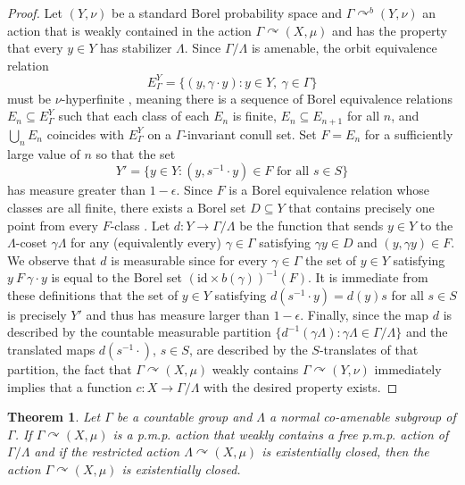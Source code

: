 \documentclass[12pt]{amsart}
\newtheorem{thm}{Theorem}[section]
\theoremstyle{definition}
\newcommand{\pmp}{p{$.$}m{$.$}p{$.$}}
\newcommand{\acts}{\curvearrowright}
\begin{document}
\begin{proof}
	Let $(Y, \nu)$ be a standard Borel probability space and $\Gamma \acts^b (Y, \nu)$ an action that is weakly contained in the action $\Gamma \acts (X, \mu)$ and has the property that every $y \in Y$ has stabilizer $\Lambda$. Since $\Gamma / \Lambda$ is amenable, the orbit equivalence relation
	$$E_\Gamma^Y = \{(y, \gamma \cdot y) : y \in Y, \ \gamma \in \Gamma\}$$
	must be $\nu$-hyperfinite \cite{OW80}, meaning there is a sequence of Borel equivalence relations $E_n \subseteq E_\Gamma^Y$ such that each class of each $E_n$ is finite, $E_n \subseteq E_{n+1}$ for all $n$, and $\bigcup_n E_n$ coincides with $E_\Gamma^Y$ on a $\Gamma$-invariant conull set. Set $F = E_n$ for a sufficiently large value of $n$ so that the set
	$$Y' = \{y \in Y : (y, s^{-1} \cdot y) \in F \text{ for all }s\in S\}$$
	has measure greater than $1-\epsilon$. Since $F$ is a Borel equivalence relation whose classes are all finite, there exists a Borel set $D \subseteq Y$ that contains precisely one point from every $F$-class \cite[Thm 12.16]{K95}. Let $d : Y \rightarrow \Gamma / \Lambda$ be the function that sends $y \in Y$ to the $\Lambda$-coset $\gamma \Lambda$ for any (equivalently every) $\gamma \in \Gamma$ satisfying $\gamma y \in D$ and $(y, \gamma y) \in F$. We observe that $d$ is measurable since for every $\gamma \in \Gamma$ the set of $y \in Y$ satisfying $y \ F \ \gamma \cdot y$ is equal to the Borel set $(\mathrm{id} \times b(\gamma))^{-1}(F)$. It is immediate from these definitions that the set of $y \in Y$ satisfying $d(s^{-1} \cdot y) = d(y) s$ for all $s\in S$ is precisely $Y'$ and thus has measure larger than $1-\epsilon$. Finally, since the map $d$ is described by the countable measurable partition $\{d^{-1}(\gamma \Lambda) : \gamma \Lambda \in \Gamma / \Lambda\}$ and the translated maps $d(s^{-1} \cdot)$, $s \in S$, are described by the $S$-translates of that partition, the fact that $\Gamma \acts (X, \mu)$ weakly contains $\Gamma \acts (Y, \nu)$ immediately implies that a function $c : X \rightarrow \Gamma / \Lambda$ with the desired property exists.
\end{proof}

\begin{thm} \label{thm:lift}
Let $\Gamma$ be a countable group and $\Lambda$ a normal co-amenable subgroup of $\Gamma$. If $\Gamma \acts (X, \mu)$ is a {\pmp} action that weakly contains a free {\pmp} action of $\Gamma / \Lambda$ and if the restricted action $\Lambda \acts (X, \mu)$ is existentially closed, then the action $\Gamma \acts (X, \mu)$ is existentially closed.
\end{thm}
\end{document}

